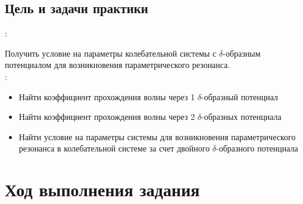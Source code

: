 \documentclass[11pt]{article}    %
\begin{document}
\subsection{Цель и задачи практики}

{:} 

Получить условие на параметры колебательной системы с $\delta$-образным потенциалом для возникновения параметрического резонанса.
\\

{:} 
\begin{itemize}
    \item Найти коэффициент прохождения волны через 1 $\delta$-образный потенциал
    \item Найти коэффициент прохождения волны через 2 $\delta$-образных потенциала
    \item Найти условие на параметры системы для возникновения параметрического резонанса в колебательной системе за счет двойного $\delta$-образного потенциала
\end{itemize}


\newpage

\section{Ход выполнения задания}
\end{document}
